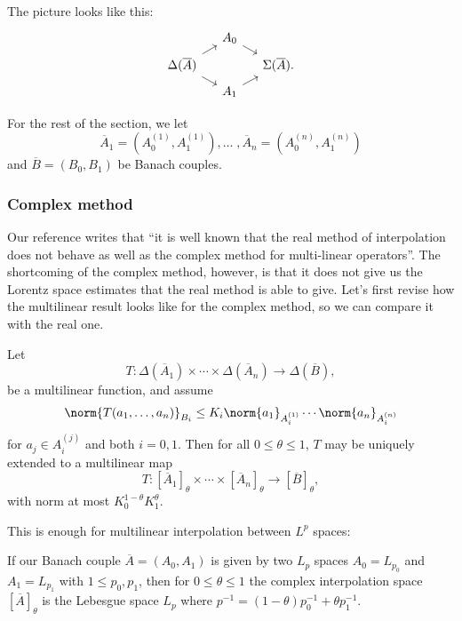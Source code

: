 \documentclass[b5paper]{article}
\begin{document}
The picture looks like this:
\[\begin{tikzcd}[row sep = tiny, column sep = small]
	& A_0 & \\
	\Delta(\overline{A}) && \Sigma(\overline{A}). \\
	& A_1
	\arrow[from=1-2, to=2-3]
	\arrow[from=2-1, to=1-2]
	\arrow[from=2-1, to=3-2]
	\arrow[from=3-2, to=2-3]
\end{tikzcd}\]

For the rest of the section, we let \[\overline{A}_1 = (A_0^{(1)},A_1^{(1)}),\dots\;,\overline{A}_n = (A_0^{(n)},A_1^{(n)})\] and \(\overline{B} = (B_0,B_1)\) be Banach couples.


\subsubsection{Complex method}
Our reference \cite{jansonInterpolationMultilinearOperators1988} writes that ``it is well known that the real method of interpolation does not behave as well as the complex method for multi-linear operators''. The shortcoming of the complex method, however, is that it does not give us the Lorentz space estimates that the real method is able to give. Let's first revise how the multilinear result looks like for the complex method, so we can compare it with the real one.

\begin{theorem}
  Let
  \[T \colon \Delta(\overline{A}_1) \times \cdots \times \Delta(\overline{A}_n) \to \Delta(\overline{B}),\]
  be a multilinear function, and assume
  \[\norm{T(a_1,\dots,a_n)}_{{B_i}} \le K_i\norm{a_1}_{{A_i^{(1)}}} \cdots \norm{a_n}_{{A_i^{(n)}}}\]
  for \(a_j \in A^{(j)}_i\) and both \(i = 0,1\). Then for all \(0\le \theta \le 1\), \(T\) may be uniquely extended to a multilinear map
  \[T \colon [\overline{A}_1]_{\theta} \times \cdots \times [\overline{A}_n]_{\theta} \to [\overline{B}]_{\theta},\]
  with norm at most \(K_0^{1 - \theta}K_1^{\theta}\).
\end{theorem}

This is enough for multilinear interpolation between \(L^p\) spaces:

\begin{note}
  If our Banach couple \(\overline{A} = (A_0,A_1)\) is given by two \(L_p\) spaces \(A_0 = L_{p_0}\) and \(A_1 = L_{{p_1}}\) with \(1 \le p_0, p_1\), then for \(0 \le \theta \le 1\) the complex interpolation space \([\overline{A}]_{\theta}\) is the Lebesgue space \(L_p\) where \(p^{-1} = (1 - \theta) p_0^{-1} + \theta p_1^{-1}\).
\end{note}
\end{document}
